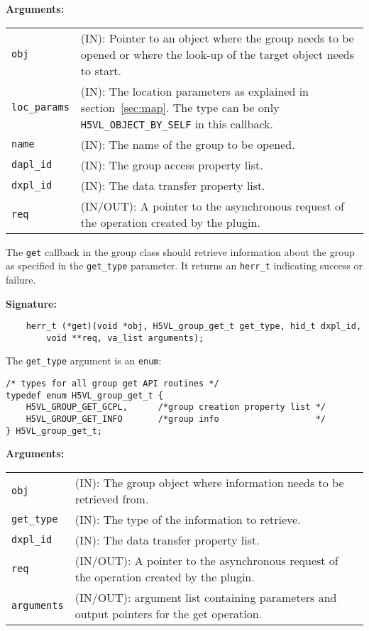 \textbf{Arguments:}\\
\begin{tabular}{l p{10cm}}
  {\tt obj} & (IN): Pointer to an object where the group needs to be
  opened or where the look-up of the target object needs to start.\\
  {\tt loc\_params} & (IN): The location parameters as explained in
  section~\ref{sec:map}. The type can be only {\tt
    H5VL\_OBJECT\_BY\_SELF} in this callback. \\
  {\tt name} & (IN): The name of the group to be opened.\\
  {\tt dapl\_id} & (IN): The group access property list.\\
  {\tt dxpl\_id} & (IN): The data transfer property list.\\
  {\tt req} & (IN/OUT): A pointer to the asynchronous request of the
  operation created by the plugin.\\
\end{tabular}

The {\tt get} callback in the group class should retrieve information
about the group as specified in the {\tt get\_type} parameter. It
returns an {\tt herr\_t} indicating success or failure.

\textbf{Signature:}
\begin{lstlisting}
    herr_t (*get)(void *obj, H5VL_group_get_t get_type, hid_t dxpl_id, 
        void **req, va_list arguments);
\end{lstlisting}

The {\tt get\_type} argument is an {\tt enum}:
\begin{lstlisting}
/* types for all group get API routines */
typedef enum H5VL_group_get_t {
    H5VL_GROUP_GET_GCPL,      /*group creation property list */
    H5VL_GROUP_GET_INFO       /*group info                   */
} H5VL_group_get_t;
\end{lstlisting}

\textbf{Arguments:}\\
\begin{tabular}{l p{10cm}}
  {\tt obj} & (IN): The group object where information needs to be
  retrieved from.\\
  {\tt get\_type} & (IN): The type of the information to retrieve.\\
  {\tt dxpl\_id} & (IN): The data transfer property list.\\
  {\tt req} & (IN/OUT): A pointer to the asynchronous request of the
  operation created by the plugin.\\
  {\tt arguments} & (IN/OUT): argument list containing parameters and
  output pointers for the get operation. \\
\end{tabular}

